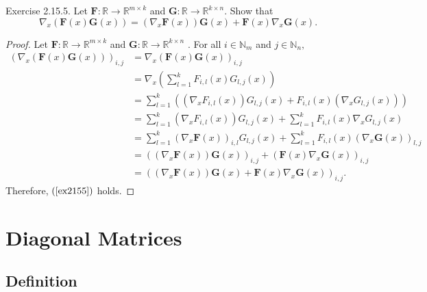 \documentclass{article}
\theoremstyle{plain}
\begin{document}
\begin{itembox}[l]{Exercise 2.15.5.}
	Let $\bm{F}:\mathbb{R} \rightarrow \mathbb{R}^{m \times k}$
	and $\bm{G}:\mathbb{R} \rightarrow \mathbb{R}^{k \times n}$. Show that
	\begin{equation}
		\label{ex2155}
		\nabla_x (\bm{F}(x) \bm{G}(x)) = (\nabla_x \bm{F}(x)) \bm{G}(x) + \bm{F}(x) \nabla_x \bm{G}(x) .
	\end{equation}
\end{itembox}


\begin{proof}
	Let $\bm{F}:\mathbb{R} \rightarrow \mathbb{R}^{m \times k}$
	and $\bm{G}:\mathbb{R} \rightarrow \mathbb{R}^{k \times n}$ .
	For all
	\begin{math}
		i \in \mathbb{N}_m
	\end{math}
	and
	\begin{math}
		j \in \mathbb{N}_n ,
	\end{math}
	\begin{equation*}
		\begin{split}
			(\nabla_x (\bm{F}(x) \bm{G}(x)))_{i,j} &= \nabla_x (\bm{F}(x) \bm{G}(x))_{i,j} \\
			&= \nabla_x \left( \sum_{l=1}^k F_{i,l}(x) G_{l,j}(x) \right) \\
			&= \sum_{l=1}^k ((\nabla_x F_{i,l}(x)) G_{l,j}(x) + F_{i,l}(x) (\nabla_x G_{l,j}(x))) \\
			&= \sum_{l=1}^k (\nabla_x F_{i,l}(x)) G_{l,j}(x) + \sum_{l=1}^k F_{i,l}(x) \nabla_x G_{l,j}(x) \\
			&= \sum_{l=1}^k (\nabla_x \bm{F}(x))_{i,l} G_{l,j}(x) + \sum_{l=1}^k F_{i,l}(x) (\nabla_x \bm{G}(x))_{l,j} \\
			&= ((\nabla_x \bm{F}(x)) \bm{G}(x))_{i,j} + (\bm{F}(x) \nabla_x \bm{G}(x))_{i,j} \\
			&= ((\nabla_x \bm{F}(x)) \bm{G}(x) + \bm{F}(x) \nabla_x \bm{G}(x))_{i,j} .
		\end{split}
	\end{equation*}
	Therefore, $(\ref{ex2155})$ holds.
\end{proof}


\section{Diagonal Matrices}

\subsection{Definition}
\end{document}

